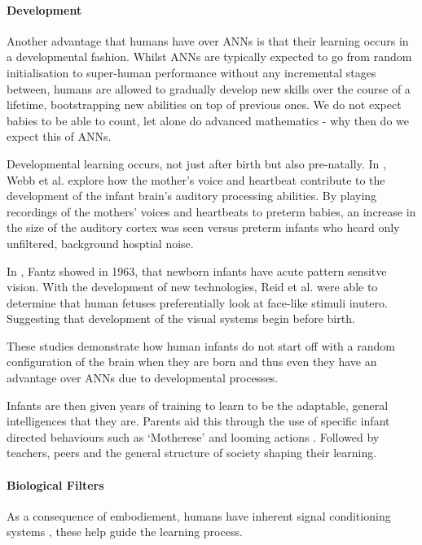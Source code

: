 \paragraph{Development}
Another advantage that humans have over \acp{ANN} is that their learning occurs in a developmental fashion. Whilst \acp{ANN} are typically expected to go from random initialisation to super-human performance without any incremental stages between, humans are allowed to gradually develop new skills over the course of a lifetime, bootstrapping new abilities on top of previous ones. We do not expect babies to be able to count, let alone do advanced mathematics - why then do we expect this of \acp{ANN}.

Developmental learning occurs, not just after birth but also pre-natally. In \cite{webb2015mother}, Webb et al. explore how the mother's voice and heartbeat contribute to the development of the infant brain's auditory processing abilities. By playing recordings of the mothers' voices and heartbeats to preterm babies, an increase in the size of the auditory cortex was seen versus preterm infants who heard only unfiltered, background hosptial noise.


In \cite{fantz1963pattern}, Fantz showed in 1963, that newborn infants have acute pattern sensitve vision. With the development of new technologies, Reid et al. \cite{reid2017human} were able to determine that human fetuses preferentially look at face-like stimuli inutero. Suggesting that development of the visual systems begin before birth.

These studies demonstrate how human infants do not start off with a random configuration of the brain when they are born and thus even they have an advantage over \acp{ANN} due to developmental processes.

Infants are then given years of training to learn to be the adaptable, general intelligences that they are. Parents aid this through the use of specific infant directed behaviours such as `Motherese' \cite{fernald1987acoustic} and looming actions \cite{lohan2012contingency, lohan2012tutor}. Followed by teachers, peers and the general structure of society shaping their learning.

\paragraph{Biological Filters}
As a consequence of embodiement, humans have inherent signal conditioning systems \cite{pezzulo2013computational}, these help guide the learning process.

